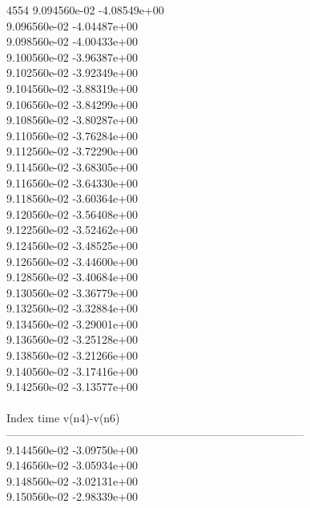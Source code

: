 4554	9.094560e-02	-4.08549e+00	\\ 	9.096560e-02	-4.04487e+00	\\ 	9.098560e-02	-4.00433e+00	\\ 	9.100560e-02	-3.96387e+00	\\ 	9.102560e-02	-3.92349e+00	\\ 	9.104560e-02	-3.88319e+00	\\ 	9.106560e-02	-3.84299e+00	\\ 	9.108560e-02	-3.80287e+00	\\ 	9.110560e-02	-3.76284e+00	\\ 	9.112560e-02	-3.72290e+00	\\ 	9.114560e-02	-3.68305e+00	\\ 	9.116560e-02	-3.64330e+00	\\ 	9.118560e-02	-3.60364e+00	\\ 	9.120560e-02	-3.56408e+00	\\ 	9.122560e-02	-3.52462e+00	\\ 	9.124560e-02	-3.48525e+00	\\ 	9.126560e-02	-3.44600e+00	\\ 	9.128560e-02	-3.40684e+00	\\ 	9.130560e-02	-3.36779e+00	\\ 	9.132560e-02	-3.32884e+00	\\ 	9.134560e-02	-3.29001e+00	\\ 	9.136560e-02	-3.25128e+00	\\ 	9.138560e-02	-3.21266e+00	\\ 	9.140560e-02	-3.17416e+00	\\ 	9.142560e-02	-3.13577e+00	\\ \hline
\\ \hline
Index   time            v(n4)-v(n6)     \\ \hline
--------------------------------------------------------------------------------\\ 	9.144560e-02	-3.09750e+00	\\ 	9.146560e-02	-3.05934e+00	\\ 	9.148560e-02	-3.02131e+00	\\ 	9.150560e-02	-2.98339e+00	\\ \hline

